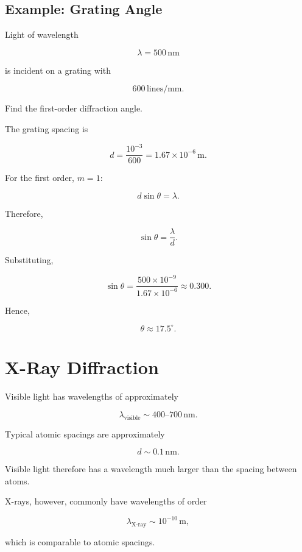 \documentclass{studentnotes}
\begin{document}
\subsection{Example: Grating Angle}

\begin{example}
    Light of wavelength

    \[
        \lambda=500\,\text{nm}
    \]

    is incident on a grating with

    \[
        600\,\text{lines/mm}.
    \]

    Find the first-order diffraction angle.
\end{example}

The grating spacing is

\[
    d
    =
    \frac{10^{-3}}{600}
    =
    1.67\times10^{-6}\,\text{m}.
\]

For the first order, \(m=1\):

\[
    d\sin\theta=\lambda.
\]

Therefore,

\[
    \sin\theta
    =
    \frac{\lambda}{d}.
\]

Substituting,

\[
    \sin\theta
    =
    \frac{500\times10^{-9}}
    {1.67\times10^{-6}}
    \approx0.300.
\]

Hence,

\[
    \boxed{
        \theta\approx17.5^\circ.
    }
\]

\section{X-Ray Diffraction}

Visible light has wavelengths of approximately

\[
    \lambda_{\text{visible}}
    \sim
    400\text{--}700\,\text{nm}.
\]

Typical atomic spacings are approximately

\[
    d\sim0.1\,\text{nm}.
\]

Visible light therefore has a wavelength much larger than the spacing between atoms.

X-rays, however, commonly have wavelengths of order

\[
    \lambda_{\text{X-ray}}
    \sim
    10^{-10}\,\text{m},
\]

which is comparable to atomic spacings.
\end{document}
